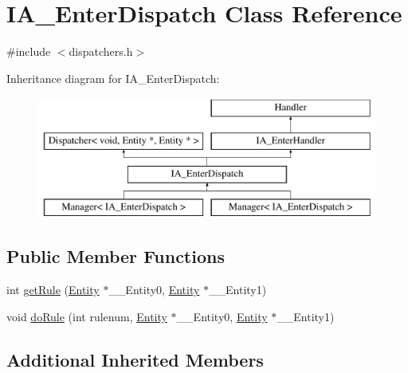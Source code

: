 \hypertarget{class_i_a___enter_dispatch}{\section{I\-A\-\_\-\-Enter\-Dispatch Class Reference}
\label{class_i_a___enter_dispatch}
}


{\ttfamily \#include $<$dispatchers.\-h$>$}

Inheritance diagram for I\-A\-\_\-\-Enter\-Dispatch\-:\begin{figure}[H]
\begin{center}
\leavevmode
\includegraphics[height=4.000000cm]{class_i_a___enter_dispatch}
\end{center}
\end{figure}
\subsection*{Public Member Functions}
\begin{DoxyCompactItemize}
\item 
int \hyperlink{class_i_a___enter_dispatch_a88d924c856eb8afde208c45feb19eaed}{get\-Rule} (\hyperlink{class_entity}{Entity} $\ast$\-\_\-\-\_\-\-Entity0, \hyperlink{class_entity}{Entity} $\ast$\-\_\-\-\_\-\-Entity1)
\item 
void \hyperlink{class_i_a___enter_dispatch_af5e262ccfebfbea6fb0b3167b77c2d6c}{do\-Rule} (int rulenum, \hyperlink{class_entity}{Entity} $\ast$\-\_\-\-\_\-\-Entity0, \hyperlink{class_entity}{Entity} $\ast$\-\_\-\-\_\-\-Entity1)
\end{DoxyCompactItemize}
\subsection*{Additional Inherited Members}


